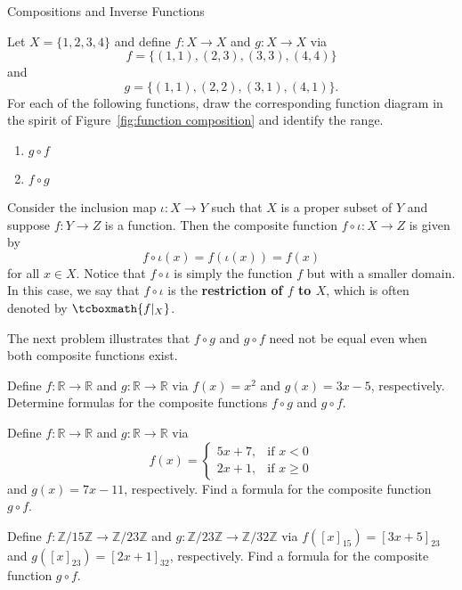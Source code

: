 \begin{section}{Compositions and Inverse Functions}
\begin{problem}
Let $X=\{1,2,3,4\}$ and define $f:X\to X$ and $g:X\to X$ via
\[
f=\{(1,1),(2,3),(3,3),(4,4)\}
\]
and
\[
g=\{(1,1),(2,2),(3,1),(4,1)\}.
\]
For each of the following functions, draw the corresponding function diagram in the spirit of Figure~\ref{fig:function composition} and identify the range.
\begin{enumerate}[label=\textrm{(\alph*)}]
\item $g\circ f$
\item $f\circ g$
\end{enumerate}
\end{problem}

\begin{example}
Consider the inclusion map $\iota:X\to Y$ such that $X$ is a proper subset of $Y$ and suppose $f:Y\to Z$ is a function. Then the composite function $f\circ \iota:X\to Z$ is given by
\[
f\circ \iota(x)=f(\iota(x))=f(x)
\]
for all $x\in X$. Notice that $f\circ \iota$ is simply the function $f$ but with a smaller domain.  In this case, we say that $f\circ \iota$ is the \textbf{restriction of $f$ to $X$}, which is often denoted by $\tcboxmath{f|_X}$.
\end{example}

The next problem illustrates that $f\circ g$ and $g\circ f$ need not be equal even when both composite functions exist.

\begin{problem}
Define $f:\mathbb{R}\to \mathbb{R}$ and $g:\mathbb{R}\to \mathbb{R}$ via $f(x)=x^2$ and $g(x)=3x-5$, respectively. Determine formulas for the composite functions $f\circ g$ and $g\circ f$.
\end{problem}

\begin{problem}
Define $f:\mathbb{R}\to \mathbb{R}$ and $g:\mathbb{R}\to \mathbb{R}$ via
\[
f(x)=\begin{cases}
5x+7, & \text{if }x< 0\\
2x+1, & \text{if }x\geq 0
\end{cases}
\]
and $g(x)=7x-11$, respectively. Find a formula for the composite function $g\circ f$.
\end{problem}

\begin{problem}
Define $f:\mathbb{Z}/15\mathbb{Z}\to \mathbb{Z}/23\mathbb{Z}$ and $g:\mathbb{Z}/23\mathbb{Z}\to \mathbb{Z}/32\mathbb{Z}$ via $f([x]_{15})=[3x+5]_{23}$ and $g([x]_{23})=[2x+1]_{32}$, respectively. Find a formula for the composite function $g\circ f$.
\end{problem}


\end{section}
